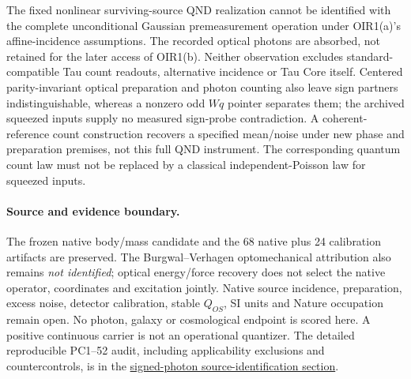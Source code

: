 \documentclass[11pt]{article}
\begin{document}
The fixed nonlinear surviving-source QND realization cannot be identified
with the complete unconditional Gaussian premeasurement operation under
OIR1(a)'s affine-incidence assumptions. The recorded optical photons are
absorbed, not retained for the later access of OIR1(b). Neither observation
excludes standard-compatible Tau count readouts, alternative incidence or
Tau Core itself. Centered parity-invariant optical preparation and photon
counting also leave sign partners indistinguishable, whereas a nonzero odd
$Wq$ pointer separates them; the archived squeezed inputs supply no measured
sign-probe contradiction. A coherent-reference count construction recovers
a specified mean/noise under new phase and preparation premises, not this
full QND instrument. The corresponding quantum count law must not be
replaced by a classical independent-Poisson law for squeezed inputs.

\paragraph{Source and evidence boundary.}
The frozen native body/mass candidate and the 68 native plus 24 calibration
artifacts are preserved. The Burgwal--Verhagen optomechanical attribution
also remains \emph{not identified}; optical energy/force recovery does not
select the native operator, coordinates and excitation jointly.
Native source incidence, preparation, excess noise, detector calibration,
stable $Q_{OS}$, SI units and Nature occupation remain open. No photon,
galaxy or cosmological endpoint is scored here. A positive continuous
carrier is not an operational quantizer. The detailed reproducible PC1--52
audit, including applicability exclusions and countercontrols, is in the
\href{https://github.com/tau-core-research/tau-core-theory/blob/main/docs/tau_core_seed_base_inverse_identifiability_and_constant_provenance_001.md#signed-photon-readout-and-a-common-resource-noise-identification}{signed-photon source-identification section}.
\end{document}
